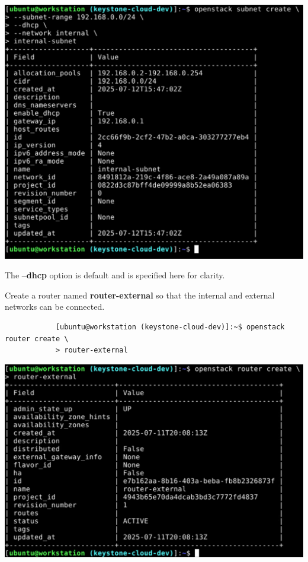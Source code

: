 \documentclass[letterpaper, 12pt]{article}
\begin{document}
\begin{enumerate}
\begin{labstep}
        \begin{center}
            \includegraphics[width=\linewidth]{images/part1/step27.png}
        \end{center}
    \end{labstep}

    \begin{notebox}
        The \textbf{--dhcp} option is default and is specified here for clarity.
    \end{notebox}

    \begin{labstep}
        Create a router named \textbf{router-external} so that the internal and external networks can be connected.
        \begin{lstlisting}
            [ubuntu@workstation (keystone-cloud-dev)]:~$ openstack router create \
            > router-external
        \end{lstlisting}

        \begin{center}
            \includegraphics[width=\linewidth]{images/part1/step28.png}
        \end{center}
    \end{labstep}


\end{enumerate}
\end{document}
